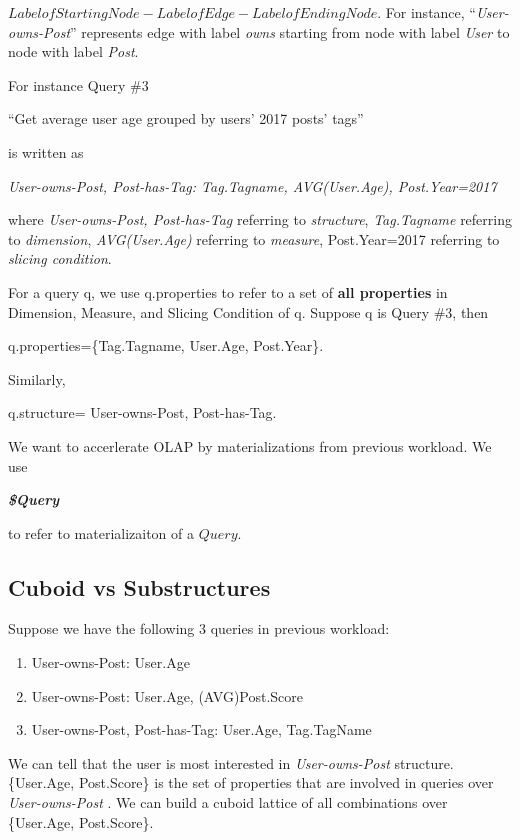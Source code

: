 $Label of Starting Node - Label of Edge - Label of Ending Node$. For instance, ``\textit{User-owns-Post}'' represents edge with label \textit{owns} starting from node with label \textit{User} to node with label \textit{Post}.


For instance Query \#3 

``Get average user age grouped by users’ 2017 posts’ tags''

is written as

\textit{User-owns-Post, Post-has-Tag: Tag.Tagname, AVG(User.Age), Post.Year=2017}

where \textit{User-owns-Post, Post-has-Tag} referring to  \textit{structure}, \textit{Tag.Tagname} referring to \textit{dimension},\textit{ AVG(User.Age) } referring to \textit{measure}, {Post.Year=2017} referring to \textit{slicing condition}.

For a query q, we use q.properties to refer to a set of \textbf{all properties} in Dimension, Measure, and Slicing Condition of q. Suppose q is Query \#3, then

 q.properties=\{Tag.Tagname, User.Age, Post.Year\}.
 
 Similarly,
 
 q.structure= User-owns-Post, Post-has-Tag.

We want to accerlerate OLAP by materializations from previous workload. We use

\textbf{\textit{\$Query}} 

to refer to materializaiton of a $Query$.



\subsection{Cuboid vs Substructures}


Suppose we have the following 3 queries in previous workload:
\begin{enumerate}
	\item User-owns-Post: User.Age
	\item User-owns-Post: User.Age, (AVG)Post.Score
	\item User-owns-Post, Post-has-Tag: User.Age, Tag.TagName
\end{enumerate}
%
%

We can tell that the user is most interested in  \textit{User-owns-Post} structure. \{User.Age, Post.Score\} is the set of properties that are involved in queries over \textit{User-owns-Post} . We can build a cuboid lattice of all combinations over  \{User.Age, Post.Score\}. 

